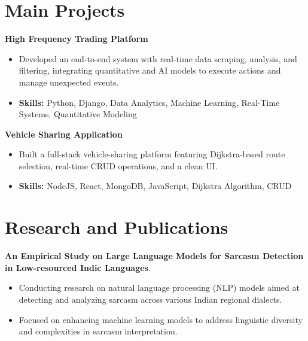 \documentclass[a4paper,11pt]{article}
\begin{document}
\section{\textbf{Main Projects}}

\vspace{1mm}
  \textbf{High Frequency Trading Platform  }
\vspace{-1.5mm} %
\begin{itemize}
  \item Developed an end-to-end system with real-time data scraping, analysis, and filtering, integrating quantitative and AI models to execute actions and manage unexpected events.
\vspace{-3mm}
  \item \textbf{Skills:} Python, Django, Data Analytics, Machine Learning, Real-Time Systems, Quantitative Modeling
\end{itemize}


\vspace{1mm}
   \textbf{Vehicle Sharing Application }
\vspace{-1.5mm} %
\begin{itemize}
  \item Built a full-stack vehicle-sharing platform featuring Dijkstra-based route selection, real-time CRUD operations, and a clean UI.
\vspace{-3mm}
  \item \textbf{Skills:} NodeJS, React, MongoDB, JavaScript, Dijkstra Algorithm, CRUD
\end{itemize}



\section{\textbf{Research and Publications} \hfill }
\vspace{1mm}
  \textbf{An Empirical Study on Large Language Models for Sarcasm Detection in Low-resourced Indic Languages}.
\vspace{-1mm} %
\begin{itemize}
  \item Conducting research on natural language processing (NLP) models aimed at detecting and analyzing sarcasm across various Indian regional dialects.
\vspace{-3mm}
  \item Focused on enhancing machine learning models to address linguistic diversity and complexities in sarcasm interpretation.
\end{itemize}
\end{document}

